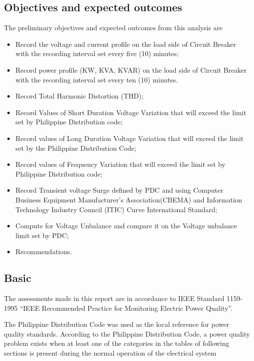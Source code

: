 \subsection{Objectives and expected outcomes}
The preliminary objectives and expected outcomes from this analysis are
\begin{itemize}
\item Record the voltage and current profile on the load side of Circuit Breaker with the recording interval  set every five (10) minutes;

\item 	Record power profile (KW, KVA, KVAR) on the load side of Circuit Breaker  with the recording interval  set every ten (10) minutes.

\item	 Record Total Harmonic Distortion (THD);

\item 	Record Values of Short Duration Voltage Variation that will exceed the limit set by Philippine Distribution code;

\item 	Record values of Long Duration Voltage Variation that will exceed the limit set by the Philippine Distribution Code;

\item 	Record values of Frequency Variation that will exceed the limit set by Philippine Distribution code;

\item 	Record Transient voltage Surge defined by PDC and using Computer Business Equipment  Manufacturer’s Association(CBEMA) and Information Technology 	Industry Council (ITIC) Curve International Standard;

\item 	Compute for Voltage Unbalance and compare it on the Voltage unbalance limit set by PDC;

\item     Recommendations.

\end{itemize}

\subsection{Basic}

The assessments made in this report are in accordance to IEEE Standard 1159-1995 “IEEE Recommended Practice for Monitoring Electric Power Quality”.

The Philippine Distribution Code was used as the local reference for power quality standards. According to the Philippine Distribution Code, a power quality problem exists when at least one of the categories in the tables of following sections is present during the normal operation of the electrical system


